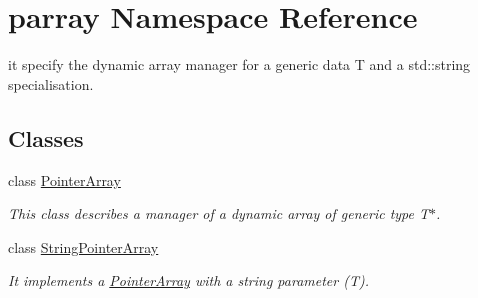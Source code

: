 \hypertarget{namespaceparray}{\section{parray Namespace Reference}
\label{namespaceparray}
}


it specify the dynamic array manager for a generic data T and a std\-::string specialisation.  


\subsection*{Classes}
\begin{DoxyCompactItemize}
\item 
class \hyperlink{classparray_1_1PointerArray}{Pointer\-Array}
\begin{DoxyCompactList}\small\item\em This class describes a manager of a dynamic array of generic type T$\ast$. \end{DoxyCompactList}\item 
class \hyperlink{classparray_1_1StringPointerArray}{String\-Pointer\-Array}
\begin{DoxyCompactList}\small\item\em It implements a \hyperlink{classparray_1_1PointerArray_ab506b284822d1e013813579e06893797}{Pointer\-Array} with a string parameter (T). \end{DoxyCompactList}\end{DoxyCompactItemize}
